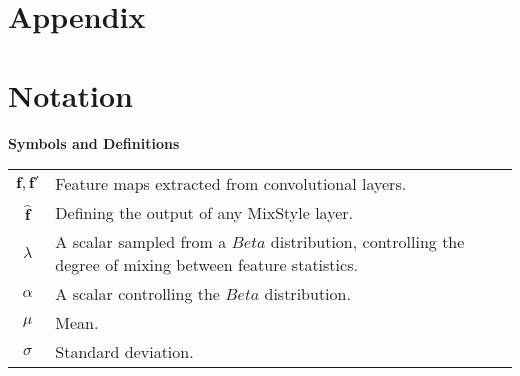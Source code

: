 \section{Appendix}
\section*{Notation}
\centerline{\bf Symbols and Definitions}
\vspace{0.5em}

\bgroup
\def\arraystretch{1.5}  %
\begin{tabular}{c p{3.5in}}
	
	$\displaystyle \mathbf{f}, \mathbf{f}'$ & Feature maps extracted from convolutional layers. \\
	
	$\displaystyle \mathbf{\hat{f}}$ & Defining the output of any MixStyle layer. \\
	
	$\displaystyle \lambda$ & A scalar sampled from a $Beta$ distribution, controlling the degree of mixing between feature statistics. \\
	
	$\displaystyle \alpha$ & A scalar controlling the $Beta$ distribution. \\
	
	$\displaystyle \mu$ & Mean. \\
	
	$\displaystyle \sigma$ & Standard deviation. \\
	
\end{tabular}
\egroup

\clearpage